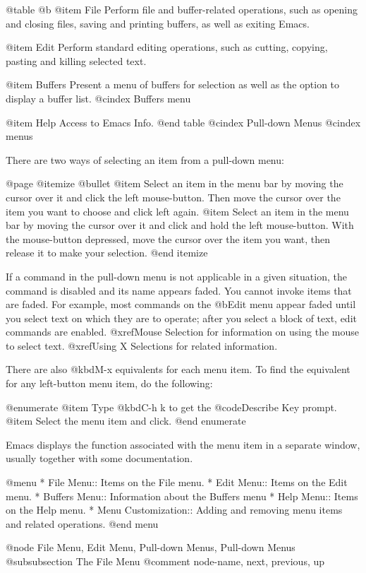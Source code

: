 {{@table @b
@item File
Perform file and buffer-related operations, such as opening and closing
files, saving and printing buffers, as well as exiting Emacs.

@item Edit
Perform standard editing operations, such as 
cutting, copying, pasting and killing selected text. 

@item Buffers
Present a menu of buffers for selection as well as the option to display
a buffer list.
@cindex Buffers menu

@item Help
Access to Emacs Info.
@end table
@cindex Pull-down Menus
@cindex menus

There are two ways of selecting an item from a pull-down menu:

@page
@itemize @bullet
@item
Select an item in the menu bar by moving the cursor over it and click the
left mouse-button.  Then move the cursor over the item you want to choose
and click left again.
@item
Select an item in the menu bar by moving the cursor over it and click and
hold the left mouse-button.  With the mouse-button depressed, move the
cursor over the item you want, then release it to make your selection. 
@end itemize

If a command in the pull-down menu is not applicable in a given
situation, the command is disabled and its name appears faded.  You
cannot invoke items that are faded.  For example, most commands on the
@b{Edit} menu appear faded until you select text on which they are to
operate; after you select a block of text, edit commands are enabled.
@xref{Mouse Selection} for information on using the mouse to select
text.  @xref{Using X Selections} for related information.

There are also @kbd{M-x} equivalents for each menu item.  To find the
equivalent for any left-button menu item, do the following:

@enumerate
@item
Type @kbd{C-h k} to get the @code{Describe Key} prompt. 
@item
Select the menu item and click. 
@end enumerate

Emacs displays the function associated with the menu item in a separate
window, usually together with some documentation. 

@menu
* File Menu::           Items on the File menu.
* Edit Menu::           Items on the Edit menu. 
* Buffers Menu::        Information about the Buffers menu
* Help Menu::           Items on the Help menu. 
* Menu Customization::  Adding and removing menu items and related
                        operations.
@end menu

@node File Menu, Edit Menu, Pull-down Menus, Pull-down Menus
@subsubsection The File Menu
@comment  node-name,  next,  previous,  up

}}
